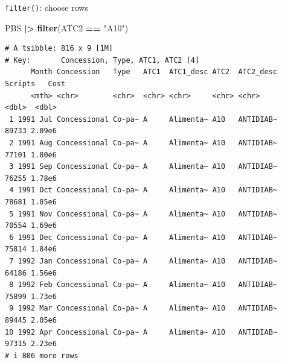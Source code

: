 \documentclass[
  14pt,
  ignorenonframetext,
  aspectratio=169,
]{beamer}
\newenvironment{Shaded}{\begin{snugshade}}{\end{snugshade}}
\newcommand{\FunctionTok}[1]{\textcolor[rgb]{0.13,0.29,0.53}{\textbf{#1}}}
\newcommand{\NormalTok}[1]{#1}
\newcommand{\SpecialCharTok}[1]{\textcolor[rgb]{0.81,0.36,0.00}{\textbf{#1}}}
\newcommand{\StringTok}[1]{\textcolor[rgb]{0.31,0.60,0.02}{#1}}
\renewenvironment{Shaded}{\vspace*{0.15cm}\color{black}\fontsize{10}{10}\sf\begin{snugshade}\color{black}}{\end{snugshade}}
\begin{document}
\begin{frame}[fragile]{\texttt{filter()}: choose rows}
\protect{}\label{filter-choose-rows}
\fontsize{8}{10}\sf

\begin{Shaded}
\begin{Highlighting}[]
\NormalTok{PBS }\SpecialCharTok{|\textgreater{}}
  \FunctionTok{filter}\NormalTok{(ATC2 }\SpecialCharTok{==} \StringTok{"A10"}\NormalTok{)}
\end{Highlighting}
\end{Shaded}

\begin{verbatim}
# A tsibble: 816 x 9 [1M]
# Key:       Concession, Type, ATC1, ATC2 [4]
      Month Concession   Type   ATC1  ATC1_desc ATC2  ATC2_desc Scripts   Cost
      <mth> <chr>        <chr>  <chr> <chr>     <chr> <chr>       <dbl>  <dbl>
 1 1991 Jul Concessional Co-pa~ A     Alimenta~ A10   ANTIDIAB~   89733 2.09e6
 2 1991 Aug Concessional Co-pa~ A     Alimenta~ A10   ANTIDIAB~   77101 1.80e6
 3 1991 Sep Concessional Co-pa~ A     Alimenta~ A10   ANTIDIAB~   76255 1.78e6
 4 1991 Oct Concessional Co-pa~ A     Alimenta~ A10   ANTIDIAB~   78681 1.85e6
 5 1991 Nov Concessional Co-pa~ A     Alimenta~ A10   ANTIDIAB~   70554 1.69e6
 6 1991 Dec Concessional Co-pa~ A     Alimenta~ A10   ANTIDIAB~   75814 1.84e6
 7 1992 Jan Concessional Co-pa~ A     Alimenta~ A10   ANTIDIAB~   64186 1.56e6
 8 1992 Feb Concessional Co-pa~ A     Alimenta~ A10   ANTIDIAB~   75899 1.73e6
 9 1992 Mar Concessional Co-pa~ A     Alimenta~ A10   ANTIDIAB~   89445 2.05e6
10 1992 Apr Concessional Co-pa~ A     Alimenta~ A10   ANTIDIAB~   97315 2.23e6
# i 806 more rows
\end{verbatim}
\end{frame}
\end{document}
